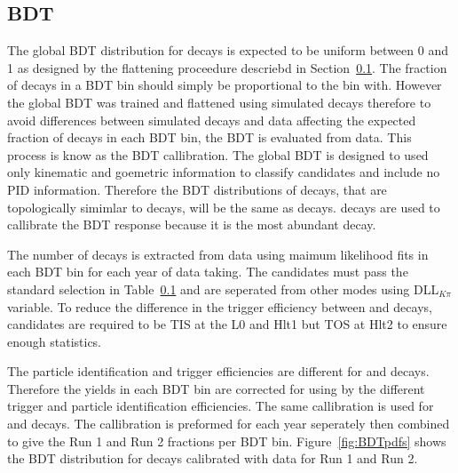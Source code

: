 \subsection{BDT \pdfs}
The global BDT distribution for \bmumu decays is expected to be uniform between 0 and 1 as designed by the flattening proceedure descriebd in Section~\ref{}. The fraction of \bmumu decays in a BDT bin should simply be proportional to the bin with. However the global BDT was trained and flattened using simulated decays therefore to avoid  differences between simulated decays and data affecting the expected fraction of \bmumu decays in each BDT bin, the BDT \pdf is evaluated from data. This process is know as the BDT callibration.
The global BDT is designed to used only kinematic and goemetric information to classify candidates and include no PID information. Therefore the BDT distributions of \bhh decays, that are topologically simimlar to \bmumu decays, will be the same as \bmumu decays. \bdkpi decays are used to callibrate the BDT response because it is the most abundant \bhh decay. 

The number of \bdkpi decays is extracted from data using maimum likelihood fits in each BDT bin for each year of data taking. The \bdkpi candidates must pass the standard \bhh selection in Table~\ref{} and are seperated from other \bhh modes using  DLL$_{K\pi}$ variable. To reduce the difference in the trigger efficiency between \bdkip and \bmumu decays, \bdkpi candidates are required to be TIS at the L0 and Hlt1 but TOS at Hlt2 to ensure enough statistics.

The particle identification and trigger efficiencies are different for \bdkpi and \bmumu decays. Therefore the \bdkpi yields in each BDT bin are corrected for using by the different trigger and particle identification efficiencies. The same callibration is used for \bsmumu and \bdmumu decays.
The callibration is preformed for each year seperately then combined to give the Run 1 and Run 2 fractions per BDT bin. Figure~\ref{fig:BDTpdfs} shows the BDT distribution for \bmumu decays calibrated with \bdkpi data for Run 1 and Run 2. 

